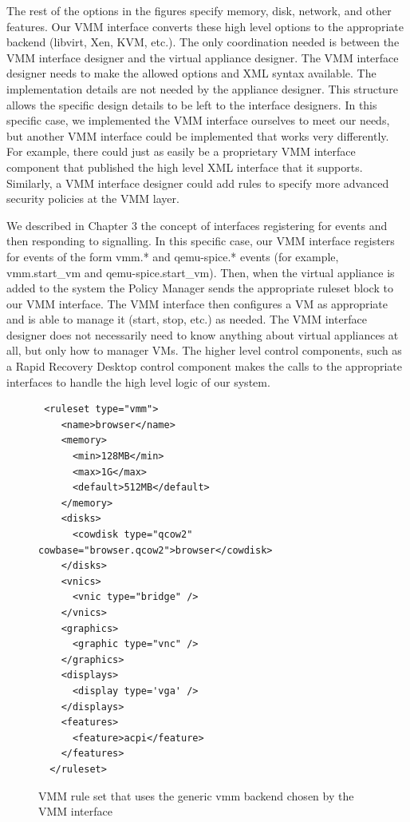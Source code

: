 The rest of the options in the figures specify memory, disk, network, and other features. Our VMM interface converts these high level options to the appropriate backend (libvirt, Xen, KVM, etc.). The only coordination needed is between the VMM interface designer and the virtual appliance designer. The VMM interface designer needs to make the allowed options and XML syntax available. The implementation details are not needed by the appliance designer. This structure allows the specific design details to be left to the interface designers. In this specific case, we implemented the VMM interface ourselves to meet our needs, but another VMM interface could be implemented that works very differently. For example, there could just as easily be a proprietary VMM interface component that published the high level XML interface that it supports. Similarly, a VMM interface designer could add rules to specify more advanced security policies at the VMM layer. 

We described in Chapter 3 the concept of interfaces registering for events and then responding to signalling. In this specific case, our VMM interface registers for events of the form vmm.* and qemu-spice.* events (for example, vmm.start\_vm and qemu-spice.start\_vm). Then, when the virtual appliance is added to the system the Policy Manager sends the appropriate ruleset block to our VMM interface. The VMM interface then configures a VM as appropriate and is able to manage it (start, stop, etc.) as needed. The VMM interface designer does not necessarily need to know anything about virtual appliances at all, but only how to manager VMs. The higher level control components, such as a Rapid Recovery Desktop control component makes the calls to the appropriate interfaces to handle the high level logic of our system.

\begin{figure}[tbp]
\caption{VMM rule set that uses the generic vmm backend chosen by the VMM interface}
\label{lst:generic-vmm}

\begin{lstlisting}
 <ruleset type="vmm">
    <name>browser</name>
    <memory>
      <min>128MB</min>
      <max>1G</max>
      <default>512MB</default>
    </memory>
    <disks>
      <cowdisk type="qcow2" cowbase="browser.qcow2">browser</cowdisk>
    </disks>
    <vnics>
      <vnic type="bridge" />
    </vnics>
    <graphics>
      <graphic type="vnc" />
    </graphics>
    <displays>  
      <display type='vga' />
    </displays>
    <features>
      <feature>acpi</feature>
    </features>
  </ruleset>
\end{lstlisting}
\end{figure}

